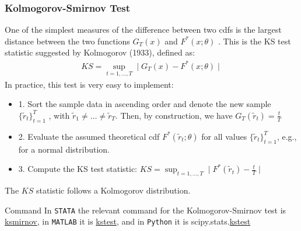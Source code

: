 \documentclass[xcolor=dvipsnames, english, 8pt]{beamer}
\begin{document}
\begin{frame}
    \frametitle{Kolmogorov-Smirnov Test}
    One of the simplest measures of the difference between two cdfs is the largest distance between the two functions $G_T (x)$ and $F^{*}(x;\theta)$ . This is the KS test statistic suggested by Kolmogorov (1933), defined as:
\begin{align}
    KS =\sup_{t=1,\hdots,T} \mid G_T(x) - F^{*}(x;\theta)\mid
\end{align}
    In practice, this test is very easy to implement: \vspace{0.25cm}\\
    \begin{itemize}
        \item 1. Sort the sample data in ascending order and denote the new sample $\{ \tilde{r}_t \}_{t=1}^T$ , with $\tilde{r}_1 \neq \hdots \neq \tilde{r}_T$. Then, by construction, we have $G_T ( \tilde{r}_t ) = \frac{t}{T}$

        \item 2. Evaluate the assumed theoretical cdf $F^{*}( \tilde{r}_t ;\theta )$ for all values $\{\tilde{r}_t\}_{t=1}^T$, e.g., for a normal distribution.

        \item 3. Compute the KS test statistic: $KS = \sup_{t=1,\hdots,T} \mid F^{*} (\tilde{r}_t)-\frac{t}{T} \mid$\vspace{0.25cm}\\
    \end{itemize}
The $KS$ statistic follows a Kolmogorov distribution.
     \vfill
\begin{exampleblock}{{\small{Command}}}
In  \texttt{STATA} the relevant command for the Kolmogorov-Smirnov test is \href{https://www.stata.com/manuals13/rksmirnov.pdf}{\color{Purple}ksmirnov}, in  \texttt{MATLAB} it is \href{https://ch.mathworks.com/help/stats/kstest.html}{\color{Purple}kstest}, and in \texttt{Python} it is scipy.stats.\href{https://docs.scipy.org/doc/scipy/reference/generated/scipy.stats.kstest.html?highlight=kstest}{\color{Purple}kstest}
\end{exampleblock}
\end{frame}
\end{document}
